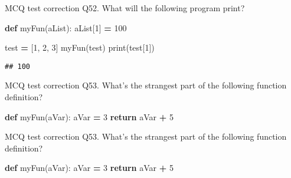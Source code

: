 \documentclass[
  8pt,
  ignorenonframetext,
]{beamer}
\newenvironment{Shaded}{\begin{snugshade}}{\end{snugshade}}
\newcommand{\BuiltInTok}[1]{#1}
\newcommand{\ControlFlowTok}[1]{\textcolor[rgb]{0.13,0.29,0.53}{\textbf{#1}}}
\newcommand{\DecValTok}[1]{\textcolor[rgb]{0.00,0.00,0.81}{#1}}
\newcommand{\KeywordTok}[1]{\textcolor[rgb]{0.13,0.29,0.53}{\textbf{#1}}}
\newcommand{\NormalTok}[1]{#1}
\newcommand{\OperatorTok}[1]{\textcolor[rgb]{0.81,0.36,0.00}{\textbf{#1}}}
\begin{document}
\begin{frame}[fragile]{MCQ test correction}
\protect\hypertarget{mcq-test-correction-103}{}
Q52. What will the following program print?

\begin{Shaded}
\begin{Highlighting}[]
\KeywordTok{def}\NormalTok{ myFun(aList):}
\NormalTok{    aList[}\DecValTok{1}\NormalTok{] }\OperatorTok{=} \DecValTok{100}

\NormalTok{test }\OperatorTok{=}\NormalTok{ [}\DecValTok{1}\NormalTok{, }\DecValTok{2}\NormalTok{, }\DecValTok{3}\NormalTok{]}
\NormalTok{myFun(test)}
\BuiltInTok{print}\NormalTok{(test[}\DecValTok{1}\NormalTok{])}
\end{Highlighting}
\end{Shaded}

\begin{verbatim}
## 100
\end{verbatim}
\end{frame}

\begin{frame}[fragile]{MCQ test correction}
\protect\hypertarget{mcq-test-correction-104}{}
Q53. What's the strangest part of the following function definition?

\begin{Shaded}
\begin{Highlighting}[]
\KeywordTok{def}\NormalTok{ myFun(aVar):}
\NormalTok{    aVar }\OperatorTok{=} \DecValTok{3}
    \ControlFlowTok{return}\NormalTok{ aVar }\OperatorTok{+} \DecValTok{5}
\end{Highlighting}
\end{Shaded}
\end{frame}

\begin{frame}[fragile]{MCQ test correction}
\protect\hypertarget{mcq-test-correction-105}{}
Q53. What's the strangest part of the following function definition?

\begin{Shaded}
\begin{Highlighting}[]
\KeywordTok{def}\NormalTok{ myFun(aVar):}
\NormalTok{    aVar }\OperatorTok{=} \DecValTok{3}
    \ControlFlowTok{return}\NormalTok{ aVar }\OperatorTok{+} \DecValTok{5}
\end{Highlighting}
\end{Shaded}
\end{frame}
\end{document}
